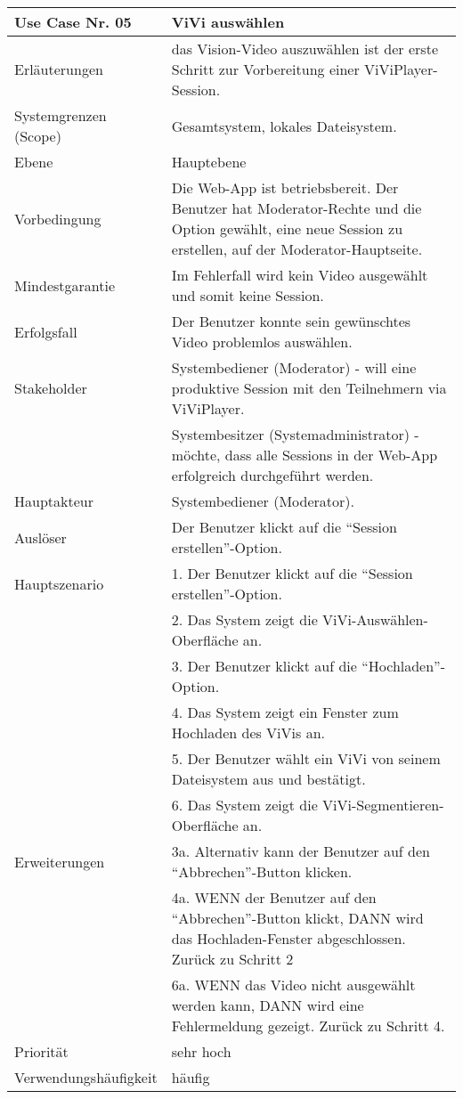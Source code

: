 \begin{tabularx}{\linewidth}{|l|X|}
	\hline
	Use Case Nr. 05			& \textbf{ViVi auswählen} \\ \hline
	Erläuterungen			& das Vision-Video auszuwählen ist der erste Schritt zur Vorbereitung
							  einer ViViPlayer-Session. \\ \hline
	Systemgrenzen (Scope)	& Gesamtsystem, lokales Dateisystem. \\ \hline
	Ebene					& Hauptebene \\ \hline
	Vorbedingung			& Die Web-App ist betriebsbereit. Der Benutzer hat 
							  Moderator-Rechte und die Option gewählt, eine neue Session zu 
							  erstellen, auf der Moderator-Hauptseite. \\ \hline
	Mindestgarantie			& Im Fehlerfall wird kein Video ausgewählt und somit keine 
							  Session.\\ \hline
	Erfolgsfall 			& Der Benutzer konnte sein gewünschtes Video problemlos auswählen. 
							  \\ \hline
	Stakeholder				& Systembediener (Moderator) - will eine produktive Session mit den 
							  Teilnehmern via ViViPlayer. \\
							& Systembesitzer (Systemadministrator) - möchte, dass alle Sessions in der
							  Web-App erfolgreich durchgeführt werden. \\ \hline
	Hauptakteur				& Systembediener (Moderator). \\ \hline
	Auslöser				& Der Benutzer klickt auf die ``Session erstellen''-Option. \\ \hline	
	Hauptszenario			& 1. Der Benutzer klickt auf die ``Session erstellen''-Option. \\
							& 2. Das System zeigt die ViVi-Auswählen-Oberfläche an. \\
							& 3. Der Benutzer klickt auf die ``Hochladen''-Option. \\
							& 4. Das System zeigt ein Fenster zum Hochladen des ViVis an. \\
							& 5. Der Benutzer wählt ein ViVi von seinem Dateisystem aus und 
							  bestätigt. \\
							& 6. Das System zeigt die ViVi-Segmentieren-Oberfläche an. \\ \hline
	Erweiterungen			& 3a. Alternativ kann der Benutzer auf den ``Abbrechen''-Button klicken. \\
							& 4a. WENN der Benutzer auf den ``Abbrechen''-Button klickt, DANN wird das
							  Hochladen-Fenster abgeschlossen. Zurück zu Schritt 2  \\
							& 6a. WENN das Video nicht ausgewählt werden kann, DANN wird eine 
							  Fehlermeldung gezeigt. Zurück zu Schritt 4. \\ \hline
	Priorität				& sehr hoch \\ \hline
	Verwendungshäufigkeit	& häufig \\ \hline
\end{tabularx}